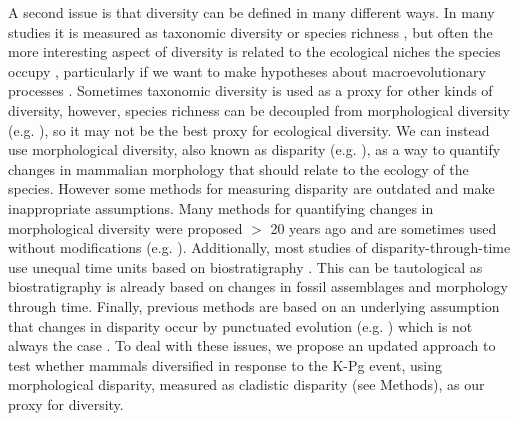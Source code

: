 \documentclass[10pt,letterpaper]{article}
\begin{document}
A second issue is that diversity can be defined in many different ways.
In many studies it is measured as taxonomic diversity or species richness \cite{Stadler12042011,meredithimpacts2011,OLeary08022013}, but often the more interesting aspect of diversity is related to the ecological niches the species occupy \cite{Wesley-Hunt2005,Brusatte12092008,toljagictriassic-jurassic2013}, particularly if we want to make hypotheses about macroevolutionary processes \cite{Pearman2008149,OlsonRadiation,Losos2010,glor2010phylogenetic,benton2015}.
Sometimes taxonomic diversity is used as a proxy for other kinds of diversity, however, species richness can be decoupled from morphological diversity (e.g. \cite{slaterCetacean,ruta2013,hopkinsdecoupling2013}), so it may not be the best proxy for ecological diversity.
We can instead use morphological diversity, also known as disparity (e.g. \cite{Wills1994,Erwin2007,Hughes20082013}), as a way to quantify changes in mammalian morphology that should relate to the ecology of the species.
However some methods for measuring disparity are outdated and make inappropriate assumptions.
Many methods for quantifying changes in morphological diversity were proposed $>$ 20 years ago \cite{Foote01071994,Wills1994} and are sometimes used without modifications (e.g. \cite{brusatte50,Brusatte12092008,cisneros2010,thorneresetting2011,prentice2011,brusattedinosaur2012,toljagictriassic-jurassic2013,ruta2013,bentonmodels2014,bensonfaunal2014}).
Additionally, most studies of disparity-through-time use unequal time units based on biostratigraphy \cite{Brusatte12092008,brusattedinosaur2012,toljagictriassic-jurassic2013}. %
This can be tautological as biostratigraphy is already based on changes in fossil assemblages and morphology through time.
Finally, previous methods are based on an underlying assumption that changes in disparity occur by punctuated evolution (e.g. \cite{Wesley-Hunt2005}) which is not always the case \cite{Hunt21042015}.
To deal with these issues, we propose an updated approach to test whether mammals diversified in response to the K-Pg event, using morphological disparity, measured as cladistic disparity (see Methods), as our proxy for diversity.
\end{document}
